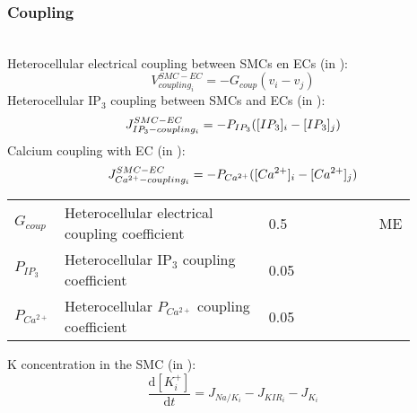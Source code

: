 \documentclass[fleqn]{report}
\numberwithin{equation}{section}
\numberwithin{equation}{section}
\begin{document}
	\subsubsection*{Coupling}~\\
	Heterocellular electrical coupling between SMCs en ECs (in \mVs):
	\begin{equation} \label{eq:Vcouplingi}
	V_{coupling_{i}}^{SMC-EC}= -G_{coup}(v_{i}-v_{j})
	\end{equation}
	Heterocellular IP$_{3}$ coupling between SMCs and ECs (in \uMs):
	\begin{equation} \label{eq:JIP3couplingi}
	J_{IP_{3}-coupling_{i}}^{SMC-EC}= -P_{IP_{3}}([IP_{3}]_{i}-[IP_{3}]_{j})
	\end{equation}
	Calcium coupling with EC (in \uMs):
	\begin{equation} \label{eq:JCAcouplingi}
	J_{Ca^{2+}-coupling_{i}}^{SMC-EC}= -P_{Ca^{2+}}([Ca^{2+}]_{i}-[Ca^{2+}]_{j})
	\end{equation}
	\begin{table}[h!]
	\centering
	\begin{tabular}{ p{0.09\linewidth}  >{\footnotesize} p{0.5\linewidth}  >{\footnotesize} p{0.27\linewidth} >{\footnotesize} p{0.03\linewidth} }
	\hline
	$G_{coup}$      		& Heterocellular electrical coupling coefficient		& 0.5 \pers	& ME \\
	$P_{IP_{3}}$      		& Heterocellular IP$_{3}$ coupling coefficient	& 0.05 \pers	&  \cite{Koenigsberger2006} \\
	$P_{Ca^{2+}}$      		& Heterocellular $P_{Ca^{2+}}$ coupling coefficient	& 0.05 \pers	&  \cite{Koenigsberger2006} \\
	\hline
	\end{tabular}
	\label{tab:JCA3couplingi}
	\end{table}
	\gls{K} concentration in the \gls{SMC} (in \uM):
	\begin{equation} \label{eq:dkidt}
	\dfrac{\mathrm{d} [K^+_{i}]}{\mathrm{d}t}  = J_{Na/K_{i}}  - J_{KIR_{i}} - J_{K_{i}}
	\end{equation}
	
\end{document}
